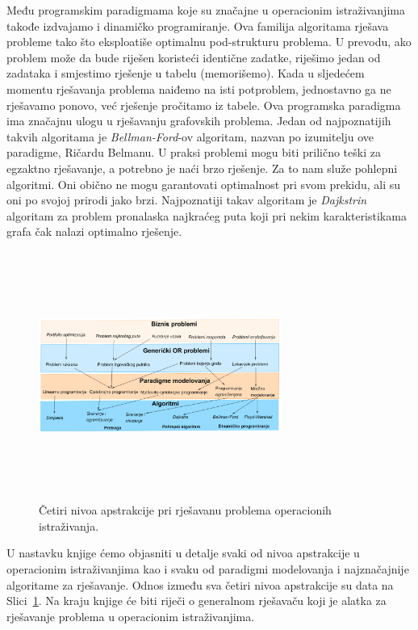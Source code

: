 \documentclass[a4paper, utf8, 11pt, colorlinks]{book}
\begin{document}
Među programskim paradigmama koje su značajne u operacionim istraživanjima takođe izdvajamo i dinamičko programiranje. Ova familija algoritama rješava probleme tako što eksploatiše optimalnu pod-strukturu problema. U prevodu, ako problem može da bude riješen koristeći identične zadatke, riješimo jedan od zadataka i smjestimo rješenje u tabelu (memorišemo). Kada u sljedećem momentu   rješavanja problema naiđemo na isti potproblem, jednostavno ga ne rješavamo ponovo, već rješenje pročitamo iz tabele. Ova programska paradigma ima značajnu ulogu u rješavanju grafovskih problema. Jedan od najpoznatijih takvih algoritama je \emph{Bellman-Ford}-ov algoritam, nazvan po izumitelju ove paradigme, Ričardu Belmanu. 
U praksi problemi mogu biti prilično teški za egzaktno rješavanje, a potrebno je naći brzo rješenje. Za to nam služe pohlepni algoritmi. Oni obično ne mogu 
garantovati optimalnost pri svom prekidu, ali su oni po svojoj prirodi jako brzi. Najpoznatiji takav algoritam je \emph{Dajkstrin} algoritam za problem pronalaska najkraćeg puta koji pri nekim karakteristikama grafa čak nalazi optimalno rješenje. 

\begin{figure}
    \centering
    \includegraphics[width=300, height=230pt]{overview.eps}
    \caption{Četiri nivoa apstrakcije pri rješavanu problema operacionih istraživanja.}
    \label{fig:OR_four_levels}
\end{figure}


U nastavku knjige ćemo objasniti u detalje svaki od nivoa apstrakcije u operacionim istraživanjima kao i svaku od paradigmi modelovanja i najznačajnije algoritame za rješavanje. Odnos između sva četiri nivoa apstrakcije su data na Slici~\ref{fig:OR_four_levels}. 
 Na kraju knjige će biti riječi o generalnom rješavaču koji je alatka za rješavanje problema u operacionim istraživanjima. 
 \\
 \newpage
 
\end{document}
